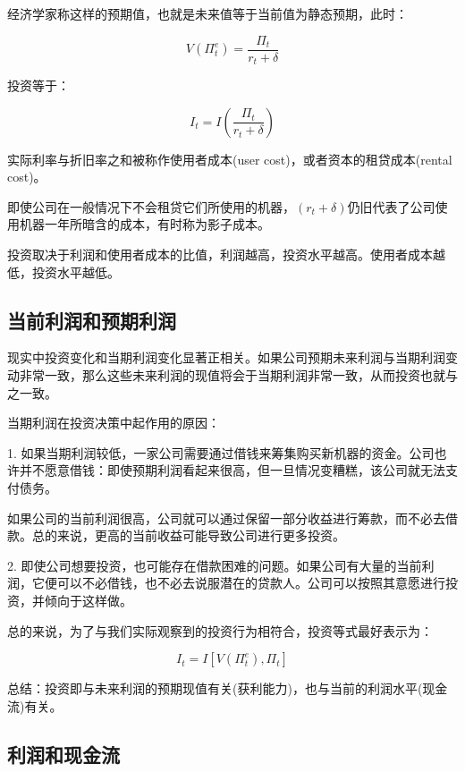\documentclass{article}
\begin{document}
经济学家称这样的预期值，也就是未来值等于当前值为静态预期，此时：

\[
V(\Pi^e_t)=\frac{\Pi_t}{r_t+\delta}
\]

投资等于：

\[
I_t=I(\frac{\Pi_t}{r_t+\delta})
\]

实际利率与折旧率之和被称作使用者成本(user cost)，或者资本的租贷成本(rental cost)。

即使公司在一般情况下不会租贷它们所使用的机器，$ (r_t+\delta) $仍旧代表了公司使用机器一年所暗含的成本，有时称为影子成本。

投资取决于利润和使用者成本的比值，利润越高，投资水平越高。使用者成本越低，投资水平越低。

\subsection{当前利润和预期利润}

现实中投资变化和当期利润变化显著正相关。如果公司预期未来利润与当期利润变动非常一致，那么这些未来利润的现值将会于当期利润非常一致，从而投资也就与之一致。

当期利润在投资决策中起作用的原因：

\hspace*{\fill}

1. 如果当期利润较低，一家公司需要通过借钱来筹集购买新机器的资金。公司也许并不愿意借钱：即使预期利润看起来很高，但一旦情况变糟糕，该公司就无法支付债务。

如果公司的当前利润很高，公司就可以通过保留一部分收益进行筹款，而不必去借款。总的来说，更高的当前收益可能导致公司进行更多投资。

\hspace*{\fill}

2. 即使公司想要投资，也可能存在借款困难的问题。如果公司有大量的当前利润，它便可以不必借钱，也不必去说服潜在的贷款人。公司可以按照其意愿进行投资，并倾向于这样做。

\hspace*{\fill}

总的来说，为了与我们实际观察到的投资行为相符合，投资等式最好表示为：

\[
I_t=I[V(\Pi^e_t),\Pi_t]
\]

总结：投资即与未来利润的预期现值有关(获利能力)，也与当前的利润水平(现金流)有关。

\subsection{利润和现金流}
\end{document}
